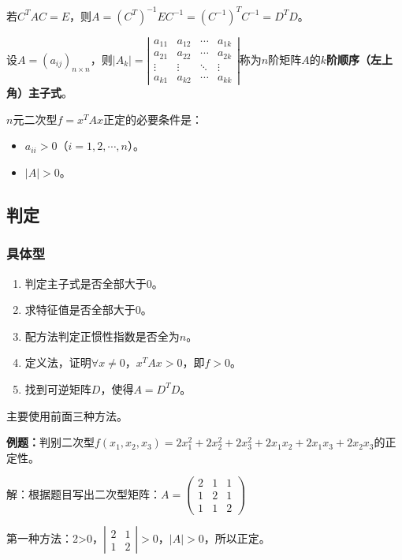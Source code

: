 若$C^TAC=E$，则$A=(C^T)^{-1}EC^{-1}=(C^{-1})^TC^{-1}=D^TD$。

设$A=(a_{ij})_{n\times n}$，则$\vert A_k\vert=\left|\begin{array}{cccc}
    a_{11} & a_{12} & \cdots & a_{1k} \\
    a_{21} & a_{22} & \cdots & a_{2k} \\
    \vdots & \vdots & \ddots & \vdots \\
    a_{k1} & a_{k2} & \cdots & a_{kk}
\end{array}\right|$称为$n$阶矩阵$A$的\textbf{$k$阶顺序（左上角）主子式}。

$n$元二次型$f=x^TAx$正定的必要条件是：

\begin{itemize}
    \item $a_{ii}>0$（$i=1,2,\cdots,n$）。
    \item $\vert A\vert>0$。
\end{itemize}

\subsection{判定}

\subsubsection{具体型}

\begin{enumerate}
    \item 判定主子式是否全部大于0。
    \item 求特征值是否全部大于0。
    \item 配方法判定正惯性指数是否全为$n$。
    \item 定义法，证明$\forall x\neq0$，$x^TAx>0$，即$f>0$。
    \item 找到可逆矩阵$D$，使得$A=D^TD$。
\end{enumerate}

主要使用前面三种方法。

\textbf{例题：}判别二次型$f(x_1,x_2,x_3)=2x_1^2+2x_2^2+2x_3^2+2x_1x_2+2x_1x_3+2x_2x_3$的正定性。

解：根据题目写出二次型矩阵：$A=\left(\begin{array}{ccc}
    2 & 1 & 1 \\
    1 & 2 & 1 \\
    1 & 1 & 2
\end{array}\right)$

第一种方法：2>0，$\left|\begin{array}{cc}
    2 & 1 \\
    1 & 2
\end{array}\right|>0$，$\vert A\vert>0$，所以正定。

